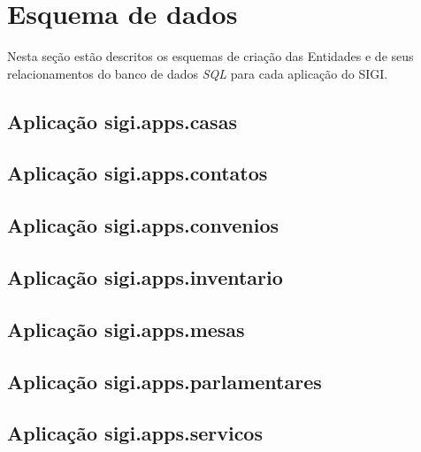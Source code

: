 %
%

\section{Esquema de dados}
\label{sec:esquema}

Nesta seção estão descritos os esquemas de criação das Entidades e de
seus relacionamentos do banco de dados \emph{SQL} para cada aplicação
do SIGI.

\subsection{Aplicação sigi.apps.casas}


\subsection{Aplicação sigi.apps.contatos}


\subsection{Aplicação sigi.apps.convenios}


\subsection{Aplicação sigi.apps.inventario}


\subsection{Aplicação sigi.apps.mesas}


\subsection{Aplicação sigi.apps.parlamentares}


\subsection{Aplicação sigi.apps.servicos}


%
%
